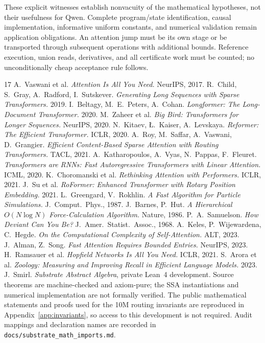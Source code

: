 \documentclass[11pt]{article}
\numberwithin{equation}{section}
\begin{document}
These explicit witnesses establish nonvacuity of the mathematical hypotheses, not their usefulness for
Qwen. Complete program/state identification, causal implementation, informative uniform constants, and
numerical validation remain application obligations. An attention jump must be its own stage or be
transported through subsequent operations with additional bounds. Reference execution, union reads,
derivatives, and all certificate work must be counted; no unconditionally cheap acceptance rule follows.

\begin{thebibliography}{17}
 A.~Vaswani et al. \emph{Attention Is All You Need.} NeurIPS, 2017.
 R.~Child, S.~Gray, A.~Radford, I.~Sutskever. \emph{Generating Long Sequences with Sparse Transformers.} 2019.
 I.~Beltagy, M.~E.~Peters, A.~Cohan. \emph{Longformer: The Long-Document Transformer.} 2020.
 M.~Zaheer et al. \emph{Big Bird: Transformers for Longer Sequences.} NeurIPS, 2020.
 N.~Kitaev, {\L}.~Kaiser, A.~Levskaya. \emph{Reformer: The Efficient Transformer.} ICLR, 2020.
 A.~Roy, M.~Saffar, A.~Vaswani, D.~Grangier. \emph{Efficient Content-Based Sparse Attention with Routing Transformers.} TACL, 2021.
 A.~Katharopoulos, A.~Vyas, N.~Pappas, F.~Fleuret. \emph{Transformers are RNNs: Fast Autoregressive Transformers with Linear Attention.} ICML, 2020.
 K.~Choromanski et al. \emph{Rethinking Attention with Performers.} ICLR, 2021.
 J.~Su et al. \emph{RoFormer: Enhanced Transformer with Rotary Position Embedding.} 2021.
 L.~Greengard, V.~Rokhlin. \emph{A Fast Algorithm for Particle Simulations.} J.~Comput.\ Phys., 1987.
 J.~Barnes, P.~Hut. \emph{A Hierarchical $O(N\log N)$ Force-Calculation Algorithm.} Nature, 1986.
 P.~A.~Samuelson. \emph{How Deviant Can You Be?} J.~Amer.\ Statist.\ Assoc., 1968.
 A.~Keles, P.~Wijewardena, C.~Hegde. \emph{On the Computational Complexity of Self-Attention.} ALT, 2023.
 J.~Alman, Z.~Song. \emph{Fast Attention Requires Bounded Entries.} NeurIPS, 2023.
 H.~Ramsauer et al. \emph{Hopfield Networks Is All You Need.} ICLR, 2021.
 S.~Arora et al. \emph{Zoology: Measuring and Improving Recall in Efficient Language Models.} 2023.
 J.~Smirl. \emph{Substrate Abstract Algebra}, private Lean~4 development. Source theorems are
machine-checked and axiom-pure; the SSA instantiations and numerical implementation are not formally verified.
The public mathematical statements and proofs used for the 10M routing invariants are reproduced in
Appendix~\ref{app:invariants}, so access to this development is not required. Audit mappings and declaration
names are recorded in \texttt{docs/substrate\_math\_imports.md}.
\end{thebibliography}
\end{document}
